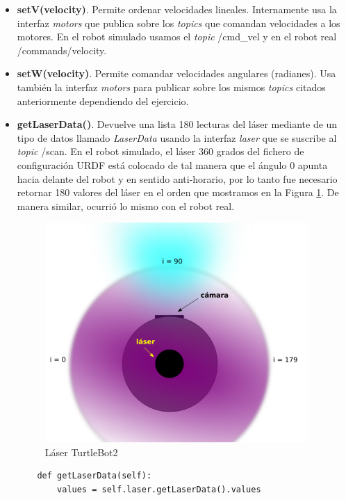 \begin{itemize}
	\item \textbf{setV(velocity)}. Permite ordenar velocidades lineales. Internamente usa la interfaz \textit{motors} que publica sobre los \textit{topics} que comandan velocidades a los motores. En el robot simulado usamos el \textit{topic} /cmd\_vel y en el robot real /commands/velocity.
	\item \textbf{setW(velocity)}. Permite comandar velocidades angulares (radianes). Usa también la interfaz \textit{motors} para publicar sobre los mismos \textit{topics} citados anteriormente dependiendo del ejercicio.
	\item \textbf{getLaserData()}. Devuelve una lista 180 lecturas del láser mediante de un tipo de datos llamado \textit{LaserData} usando la interfaz \textit{laser} que se suscribe al \textit{topic} /scan. En el robot simulado, el láser 360 grados del fichero de configuración URDF está colocado de tal manera que el ángulo 0 apunta hacia delante del robot y en sentido anti-horario, por lo tanto fue necesario retornar 180 valores del láser en el orden que mostramos en la Figura \ref{fig:vista_planta_turtlebot2}. De manera similar, ocurrió lo mismo con el robot real.
\begin{figure} [H]
  \begin{center}
    \includegraphics[width=10cm]{imagenes/cap5/vista-planta-turtlebot2.png}
  \end{center}
  \caption[Láser TurtleBot2]{Láser TurtleBot2}
  \label{fig:vista_planta_turtlebot2}
\end{figure}
\begin{code}[H]
	\begin{lstlisting}
	def getLaserData(self):
		values = self.laser.getLaserData().values

\end{lstlisting}
\end{code}
\end{itemize}
